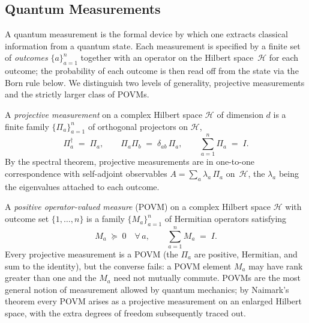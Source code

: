 \subsection{Quantum Measurements}
\label{sec:quantum-measurements}

A quantum measurement is the formal device by which one extracts
classical information from a quantum state. Each measurement is
specified by a finite set of \emph{outcomes}
$\{a\}_{a = 1}^{n}$ together with an operator on the Hilbert
space~$\mathcal{H}$ for each outcome; the probability of each outcome
is then read off from the state via the Born rule below. We
distinguish two levels of generality, projective measurements and the
strictly larger class of POVMs.

\begin{definition}
\label{def:pvm}
A \emph{projective measurement} on a complex Hilbert space $\mathcal{H}$
of dimension $d$ is a finite family $\{\Pi_a\}_{a = 1}^{n}$ of
orthogonal projectors on $\mathcal{H}$,
\begin{equation}
  \Pi_a^{\dagger} \;=\; \Pi_a, \qquad
  \Pi_a \Pi_b \;=\; \delta_{ab}\, \Pi_a, \qquad
  \sum_{a = 1}^{n} \Pi_a \;=\; I.
  \label{eq:pvm}
\end{equation}
By the spectral theorem, projective measurements are in one-to-one
correspondence with self-adjoint observables
$A = \sum_a \lambda_a\, \Pi_a$ on~$\mathcal{H}$, the $\lambda_a$
being the eigenvalues attached to each outcome.
\end{definition}

\begin{definition}
\label{def:povm}
A \emph{positive operator-valued measure} (POVM) on a complex Hilbert
space $\mathcal{H}$ with outcome set $\{1, \dots, n\}$ is a family
$\{M_a\}_{a = 1}^{n}$ of Hermitian operators satisfying
\begin{equation}
  M_a \;\succeq\; 0 \quad \forall\, a, \qquad
  \sum_{a = 1}^{n} M_a \;=\; I.
  \label{eq:povm-defining}
\end{equation}
Every projective measurement is a POVM (the $\Pi_a$ are positive,
Hermitian, and sum to the identity), but the converse fails: a POVM
element $M_a$ may have rank greater than one and the $M_a$ need not
mutually commute. POVMs are the most general notion of measurement
allowed by quantum mechanics; by Naimark's theorem every POVM arises
as a projective measurement on an enlarged Hilbert space, with the
extra degrees of freedom subsequently traced out.
\end{definition}

